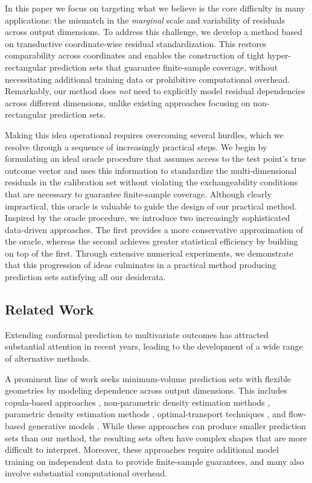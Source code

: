In this paper we focus on targeting what we believe is the core difficulty in many applications: the mismatch in the {\em marginal} scale and variability of residuals across output dimensions. 
To address this challenge, we develop a method based on transductive coordinate-wise residual standardization. This restores comparability across coordinates and enables the construction of tight hyper-rectangular prediction sets that guarantee finite-sample coverage, without necessitating additional training data or prohibitive computational overhead. Remarkably, our method does {\em not} need to explicitly model residual dependencies across different dimensions, unlike existing approaches focusing on non-rectangular prediction sets.

Making this idea operational requires overcoming several hurdles, which we resolve through a sequence of increasingly practical steps. We begin by formulating an ideal oracle procedure that assumes access to the test point’s true outcome vector and uses this information to standardize the multi-dimensional residuals in the calibration set without violating the exchangeability conditions that are necessary to guarantee finite-sample coverage. Although clearly impractical, this oracle is valuable to guide the design of our practical method.
Inspired by the oracle procedure, we introduce two increasingly sophisticated data-driven approaches. The first provides a more conservative approximation of the oracle, whereas the second achieves greater statistical efficiency by building on top of the first. Through extensive numerical experiments, we demonstrate that this progression of ideas culminates in a practical method producing prediction sets satisfying all our desiderata.


\subsection{Related Work}
\label{sec:related-work}

Extending conformal prediction to multivariate outcomes has attracted substantial attention in recent years, leading to the development of a wide range of alternative methods.

A prominent line of work seeks minimum-volume prediction sets with flexible geometries by modeling dependence across output dimensions.
This includes copula-based approaches \citep{messoudi2021copula, pmlr-v258-park25c, sun2024copula}, non-parametric density estimation methods \citep{sadinle2016least,izbicki2022cdsplit,wang2023pcp, dheur2025unified}, parametric density estimation methods \citep{johnstone2021conformal,sampson2024conformal,braun2025minimum,braun2025multivariate}, optimal-transport techniques \citep{thurin2025otcp, klein2025multivariate}, and flow-based generative models \citep{colombo2024normalizing, lee2025flow, fang2025contra}. While these approaches can produce smaller prediction sets than our method, the resulting sets often have complex shapes that are more difficult to interpret. Moreover, these approaches require additional model training on independent data to provide finite-sample guarantees, and many also involve substantial computational overhead.


